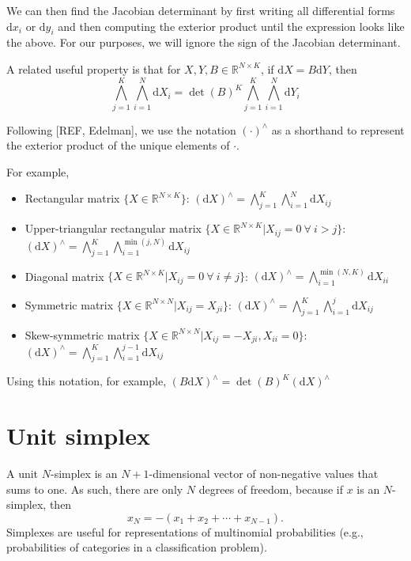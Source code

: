 \documentclass[11pt]{article}
\newcommand{\dv}[1]{\mathrm{d}{#1}}
\begin{document}
We can then find the Jacobian determinant by first writing all differential forms $\dv{x_i}$ or $\dv{y_i}$ and then computing the exterior product until the expression looks like the above.
For our purposes, we will ignore the sign of the Jacobian determinant.

A related useful property is that for $X,Y,B \in \mathbb{R}^{N \times K}$, if $\dv{X} = B \dv{Y}$, then
\[\bigwedge_{j=1}^K \bigwedge_{i=1}^N \dv{X_i} = \det(B)^K \bigwedge_{j=1}^K \bigwedge_{i=1}^N \dv{Y_i}\]

Following [REF, Edelman], we use the notation $(\cdot)^\wedge$ as a shorthand to represent the exterior product of the unique elements of $\cdot$.

For example,
\begin{itemize}
  \item Rectangular matrix $\{X \in \mathbb{R}^{N \times K}\}$: $(\dv{X})^\wedge = \bigwedge_{j=1}^K \bigwedge_{i=1}^N \dv{X_{ij}}$
  \item Upper-triangular rectangular matrix $\{X \in \mathbb{R}^{N \times K} | X_{ij} = 0\ \forall\ i > j\}$: $(\dv{X})^\wedge = \bigwedge_{j=1}^K \bigwedge_{i=1}^{\min(j, N)} \dv{X_{ij}}$
  \item Diagonal matrix $\{X \in \mathbb{R}^{N \times K} | X_{ij} = 0\ \forall\ i \ne j\}$: $(\dv{X})^\wedge = \bigwedge_{i=1}^{\min(N, K)} \dv{X_{ii}}$
  \item Symmetric matrix $\{X \in \mathbb{R}^{N \times N} | X_{ij} = X_{ji}\}$: $(\dv{X})^\wedge = \bigwedge_{j=1}^K \bigwedge_{i=1}^{j} \dv{X_{ij}}$
  \item Skew-symmetric matrix $\{X \in \mathbb{R}^{N \times N} | X_{ij} = -X_{ji}, X_{ii} = 0\}$: $(\dv{X})^\wedge = \bigwedge_{j=1}^K \bigwedge_{i=1}^{j-1} \dv{X_{ij}}$
\end{itemize}

Using this notation, for example, $(B \dv{X})^\wedge = \det(B)^K (\dv{X})^\wedge$

\section{Unit simplex}

A unit $N$-simplex is an $N + 1$-dimensional vector of non-negative
values that sums to one.  As such, there are only $N$ degrees of
freedom, because if $x$ is an $N$-simplex, then
\[
  x_N = -(x_1 + x_2 + \cdots + x_{N-1}).
\]
Simplexes are useful for representations of multinomial probabilities
(e.g., probabilities of categories in a classification problem).
\end{document}
